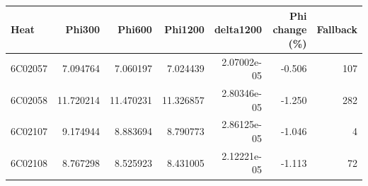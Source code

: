 \begingroup
{}
\begin{tabular}{lrrrrrr}
\toprule
Heat & Phi300 & Phi600 & Phi1200 & delta1200 & Phi change (\%) & Fallback \\
\midrule
6C02057 & 7.094764 & 7.060197 & 7.024439 & 2.07002e-05 & -0.506 & 107 \\
6C02058 & 11.720214 & 11.470231 & 11.326857 & 2.80346e-05 & -1.250 & 282 \\
6C02107 & 9.174944 & 8.883694 & 8.790773 & 2.86125e-05 & -1.046 & 4 \\
6C02108 & 8.767298 & 8.525923 & 8.431005 & 2.12221e-05 & -1.113 & 72 \\
\bottomrule
\end{tabular}
\endgroup
